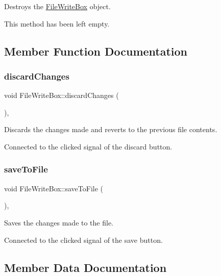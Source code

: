 Destroys the \hyperlink{classFileWriteBox}{File\+Write\+Box} object. 

This method has been left empty. 

\subsection{Member Function Documentation}
\mbox{\label{classFileWriteBox_a5db76473f102a2cc369390cd0638eb86}} 
\subsubsection{\texorpdfstring{discard\+Changes}{discardChanges}}
{\footnotesize\ttfamily void File\+Write\+Box\+::discard\+Changes (\begin{DoxyParamCaption}{ }\end{DoxyParamCaption})\hspace{0.3cm}{\ttfamily [private]}, {\ttfamily [slot]}}



Discards the changes made and reverts to the previous file contents. 

Connected to the clicked signal of the discard button. \mbox{\label{classFileWriteBox_a2567b35b54e7f5e87069c9ea5dc82b9b}} 
\subsubsection{\texorpdfstring{save\+To\+File}{saveToFile}}
{\footnotesize\ttfamily void File\+Write\+Box\+::save\+To\+File (\begin{DoxyParamCaption}{ }\end{DoxyParamCaption})\hspace{0.3cm}{\ttfamily [private]}, {\ttfamily [slot]}}



Saves the changes made to the file. 

Connected to the clicked signal of the save button. 

\subsection{Member Data Documentation}
\mbox{\label{classFileWriteBox_ae6599208365ef57c160e99e67f7ebe15}} 
